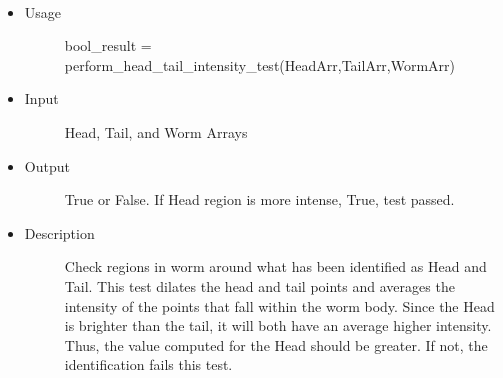 \documentclass[letterpaper,10pt,oneside]{sphinxmanual}
\begin{document}
\begin{fulllineitems}
\label{index:libcelegans.perform_head_tail_intensity_test}~\begin{itemize}
\item {} \begin{description}
\item[{Usage}] \leavevmode
bool\_result = perform\_head\_tail\_intensity\_test(HeadArr,TailArr,WormArr)

\end{description}

\item {} \begin{description}
\item[{Input}] \leavevmode
Head, Tail, and Worm Arrays

\end{description}

\item {} \begin{description}
\item[{Output}] \leavevmode
True or False. If Head region is more intense, True, test passed.

\end{description}

\item {} \begin{description}
\item[{Description }] \leavevmode
Check regions in worm around what has been identified as Head and Tail.
This test dilates the head and tail points and averages the intensity of the
points that fall within the worm body. Since the Head is brighter 
than the tail, it will both have an average higher intensity. 
Thus, the value computed for the Head should be greater.  If not, 
the identification fails this test.

\end{description}

\end{itemize}

\end{fulllineitems}

\end{document}
